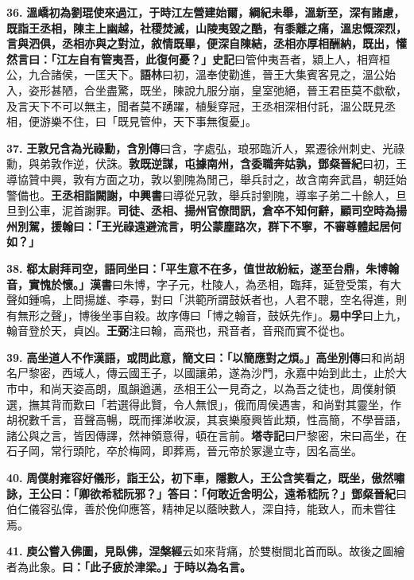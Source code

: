 \textbf{36.} \textbf{溫嶠初為劉琨使來過江，于時江左營建始爾，綱紀未舉，溫新至，深有諸慮，既詣王丞相，陳主上幽越，社稷焚滅，山陵夷毀之酷，有黍離之痛，溫忠慨深烈，言與泗俱，丞相亦與之對泣，敘情既畢，便深自陳結，丞相亦厚相酬納，既出，懽然言曰：「江左自有管夷吾，此復何憂？」}{\footnotesize \textbf{史記}曰管仲夷吾者，潁上人，相齊桓公，九合諸侯，一匡天下。\textbf{語林}曰初，溫奉使勸進，晉王大集賓客見之，溫公始入，姿形甚陋，合坐盡驚，既坐，陳說九服分崩，皇室弛絕，晉王君臣莫不歔欷，及言天下不可以無主，聞者莫不踴躍，植髮穿冠，王丞相深相付託，溫公既見丞相，便游樂不住，曰「既見管仲，天下事無復憂」。}

\textbf{37.} \textbf{王敦兄含為光祿勳，}{\footnotesize \textbf{含別傳}曰含，字處弘，琅邪臨沂人，累遷徐州刺史、光祿勳，與弟敦作逆，伏誅。}\textbf{敦既逆謀，屯據南州，含委職奔姑孰，}{\footnotesize \textbf{鄧粲晉紀}曰初，王導協贊中興，敦有方面之功，敦以劉隗為閒己，舉兵討之，故含南奔武昌，朝廷始警備也。}\textbf{王丞相詣闕謝，}{\footnotesize \textbf{中興書}曰導從兄敦，舉兵討劉隗，導率子弟二十餘人，旦旦到公車，泥首謝罪。}\textbf{司徒、丞相、揚州官僚問訊，倉卒不知何辭，顧司空時為揚州別駕，援翰曰：「王光祿遠避流言，明公蒙塵路次，群下不寧，不審尊體起居何如？」}

\textbf{38.} \textbf{郗太尉拜司空，語同坐曰：「平生意不在多，值世故紛紜，遂至台鼎，朱博翰音，實愧於懷。」}{\footnotesize \textbf{漢書}曰朱博，字子元，杜陵人，為丞相，臨拜，延登受策，有大聲如鍾鳴，上問揚雄、李尋，對曰「洪範所謂鼓妖者也，人君不聰，空名得進，則有無形之聲」，博後坐事自殺。故序傳曰「博之翰音，鼓妖先作」。\textbf{易中孚}曰上九，翰音登於天，貞凶。\textbf{王弼}注曰翰，高飛也，飛音者，音飛而實不從也。}

\textbf{39.} \textbf{高坐道人不作漢語，或問此意，簡文曰：「以簡應對之煩。」}{\footnotesize \textbf{高坐別傳}曰和尚胡名尸黎密，西域人，傳云國王子，以國讓弟，遂為沙門，永嘉中始到此土，止於大市中，和尚天姿高朗，風韻遒邁，丞相王公一見奇之，以為吾之徒也，周僕射領選，撫其背而歎曰「若選得此賢，令人無恨」，俄而周侯遇害，和尚對其靈坐，作胡祝數千言，音聲高暢，既而揮涕收涙，其哀樂廢興皆此類，性高簡，不學晉語，諸公與之言，皆因傳譯，然神領意得，頓在言前。\textbf{塔寺記}曰尸黎密，宋曰高坐，在石子岡，常行頭陀，卒於梅岡，即葬焉，晉元帝於冢邊立寺，因名高坐。}

\textbf{40.} \textbf{周僕射雍容好儀形，詣王公，初下車，隱數人，王公含笑看之，既坐，傲然嘯詠，王公曰：「卿欲希嵇阮邪？」答曰：「何敢近舍明公，遠希嵇阮？」}{\footnotesize \textbf{鄧粲晉紀}曰伯仁儀容弘偉，善於俛仰應答，精神足以蔭映數人，深自持，能致人，而未嘗往焉。}

\textbf{41.} \textbf{庾公嘗入佛圖，見臥佛，}{\footnotesize \textbf{涅槃經}云如來背痛，於雙樹間北首而臥。故後之圖繪者為此象。}\textbf{曰：「此子疲於津梁。」于時以為名言。}

